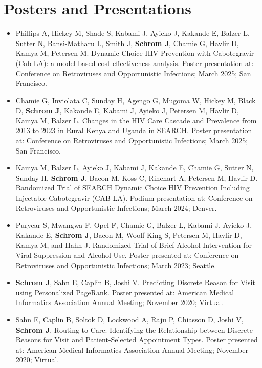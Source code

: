 \documentclass[11pt]{article}
\begin{document}
\section{Posters and Presentations}
\begin{itemize}
    \setlength{\itemsep}{1em}
    \renewcommand{\labelitemi}{}
    \setlength{\leftskip}{-1.5em}
    \item Phillips A, Hickey M, Shade S, Kabami J, Ayieko J, Kakande E, Balzer L, Sutter N, Bansi-Matharu L, Smith J, \textbf{Schrom J}, Chamie G, Havlir D, Kamya M, Petersen M. Dynamic Choice HIV Prevention with Cabotegravir (Cab-LA): a model-based cost-effectiveness analysis. Poster presentation at: Conference on Retroviruses and Opportunistic Infections; March 2025; San Francisco. 
    \item Chamie G, Inviolata C, Sunday H, Agengo G, Mugoma W, Hickey M, Black D, \textbf{Schrom J}, Kakande E, Kabami J, Ayieko J, Petersen M, Havlir D, Kamya M, Balzer L. Changes in the HIV Care Cascade and Prevalence from 2013 to 2023 in Rural Kenya and Uganda in SEARCH. Poster presentation at: Conference on Retroviruses and Opportunistic Infections; March 2025; San Francisco. 
    \item Kamya M, Balzer L, Ayieko J, Kabami J, Kakande E, Chamie G, Sutter N, Sunday H, \textbf{Schrom J}, Bacon M, Koss C, Rinehart A, Petersen M, Havlir D. Randomized Trial of SEARCH Dynamic Choice HIV Prevention Including Injectable Cabotegravir (CAB-LA). Podium presentation at: Conference on Retroviruses and Opportunistic Infections; March 2024; Denver. 
    \item Puryear S, Mwangwa F, Opel F, Chamie G, Balzer L, Kabami J, Ayieko J, Kakande E, \textbf{Schrom J}, Bacon M, Woolf-King S, Petersen M, Havlir D, Kamya M, and Hahn J. Randomized Trial of Brief Alcohol Intervention for Viral Suppression and Alcohol Use. Poster presented at: Conference on Retroviruses and Opportunistic Infections; March 2023; Seattle. 
    \item \textbf{Schrom J}, Sahn E, Caplin B, Joshi V. Predicting Discrete Reason for Visit using Personalized PageRank. Poster presented at: American Medical Informatics Association Annual Meeting; November 2020; Virtual.
    \item Sahn E, Caplin B, Soltok D, Lockwood A, Raju P, Chiasson D, Joshi V, \textbf{Schrom J}. Routing to Care: Identifying the Relationship between Discrete Reasons for Visit and Patient-Selected Appointment Types. Poster presented at: American Medical Informatics Association Annual Meeting; November 2020; Virtual.

\end{itemize}
\end{document}
